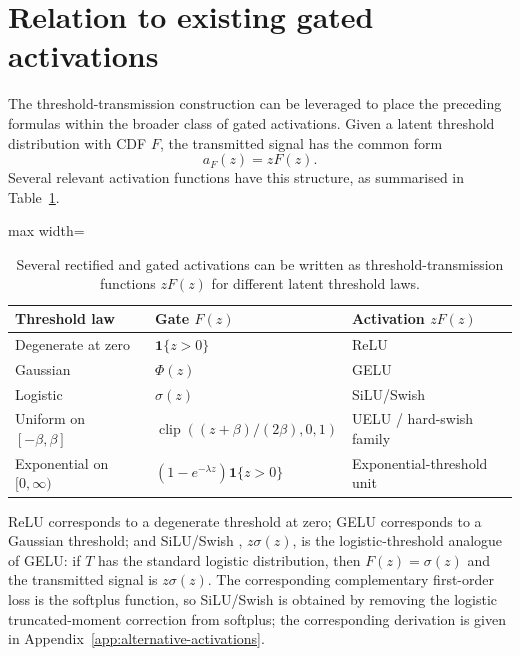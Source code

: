 \documentclass[11pt]{article}
\begin{document}
\section{Relation to existing gated activations}
\label{sec:relation-existing-activations}

The threshold-transmission construction can be leveraged to place the preceding formulas within the broader class of gated activations. Given a latent threshold distribution with CDF $F$, the transmitted signal has the common form
$$
a_F(z)=zF(z).
$$
Several relevant activation functions have this structure, as summarised in Table~\ref{tab:threshold-family}.

\begin{table}[tbp]
\centering
\small
\begin{adjustbox}{max width=\textwidth}
\begin{tabular}{@{}lll@{}}
\toprule
Threshold law & Gate $F(z)$ & Activation $zF(z)$ \\
\midrule
Degenerate at zero & $\mathbf{1}\{z>0\}$ & ReLU \\
Gaussian & $\Phi(z)$ & GELU \\
Logistic & $\sigma(z)$ & SiLU/Swish \\
Uniform on $[-\beta,\beta]$ & $\operatorname{clip}\left((z+\beta)/(2\beta),0,1\right)$ & UELU / hard-swish family \\
Exponential on $[0,\infty)$ & $(1-e^{-\lambda z})\mathbf{1}\{z>0\}$ & Exponential-threshold unit \\
\bottomrule
\end{tabular}
\end{adjustbox}
\caption{Several rectified and gated activations can be written as threshold-transmission functions $zF(z)$ for different latent threshold laws.}
\label{tab:threshold-family}
\end{table}

ReLU corresponds to a degenerate threshold at zero; GELU corresponds to a Gaussian threshold; and SiLU/Swish \cite{Elfwing2018}, $ z\sigma(z) $, is the logistic-threshold analogue of GELU: if $T$ has the standard logistic distribution, then $F(z)=\sigma(z)$ and the transmitted signal is $z\sigma(z)$. The corresponding complementary first-order loss is the softplus function, so SiLU/Swish is obtained by removing the logistic truncated-moment correction from softplus; the corresponding derivation is given in Appendix~\ref{app:alternative-activations}. 
\end{document}
